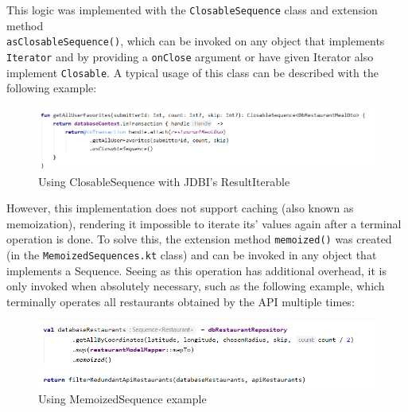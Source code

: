 This logic was implemented with the \texttt{ClosableSequence} class and extension method\\
\texttt{asClosableSequence()}, which can be invoked
on any object that implements \texttt{Iterator} and by providing a \texttt{onClose} argument or have given Iterator also implement \texttt{Closable}.
A typical usage of this class can be described with the following example:\\

\begin{figure}[H]
    \begin{center}
        \includegraphics[scale=0.8]{_figures/5.2.5-1.png}
        \caption{Using ClosableSequence with JDBI's ResultIterable}
    \end{center}
\end{figure}

However, this implementation does not support caching (also known as memoization), rendering it impossible to iterate its' values again after a terminal
operation is done. To solve this, the extension method \texttt{memoized()} was created (in the \texttt{MemoizedSequences.kt} class) and can be invoked in
any object that implements a Sequence. Seeing as this operation has additional overhead, it is only invoked when absolutely necessary,
such as the following example, which terminally operates all restaurants obtained by the API multiple times:\\

\begin{figure}[H]
    \begin{center}
        \includegraphics[scale=0.8]{_figures/5.2.5-2.png}
        \caption{Using MemoizedSequence example}
    \end{center}
\end{figure}

